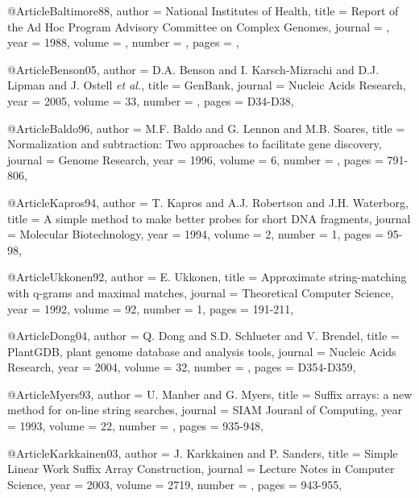 @Article{Baltimore88,
  author =      {{National Institutes of Health}},
  title =       {Report of the Ad Hoc Program Advisory Committee on Complex Genomes},
  journal =     {},
  year =        {1988},
  volume =      {},
  number =      {},
  pages =       {},
}


@Article{Benson05,
  author =       {D.A. Benson and I. Karsch-Mizrachi and D.J. Lipman and J. Ostell {\it et al.}},
  title =      {{GenBank}},
  journal =     {Nucleic Acids Research},
  year =        {2005},
  volume =      {33},
  number =      {},
  pages =       {D34-D38},
}

@Article{Baldo96,
  author =      {M.F. Baldo and G. Lennon and M.B. Soares},
  title =       {{Normalization and subtraction: Two approaches to facilitate gene discovery}},
  journal =     {Genome Research},
  year =        {1996},
  volume =      {6},
  number =      {},
  pages =       {791-806},
}

@Article{Kapros94,
  author =      {T. Kapros and A.J. Robertson and J.H. Waterborg},
  title =       {A simple method to make better probes for short {DNA} fragments},
  journal =     {Molecular Biotechnology},
  year =        {1994},
  volume =      {2},
  number =      {1},
  pages =       {95-98},
}




@Article{Ukkonen92,
  author =      {E. Ukkonen},
  title =       {Approximate string-matching with q-grams and maximal matches},
  journal =     {Theoretical Computer Science},
  year =        {1992},
  volume =      {92},
  number =      {1},
  pages =       {191-211},
}



@Article{Dong04,
  author =      {Q. Dong and S.D. Schlueter and V. Brendel},
  title =       {{PlantGDB, plant genome database and analysis tools}},
  journal =     {Nucleic Acids Research},
  year =        {2004},
  volume =      {32},
  number =      {},
  pages =       {D354-D359},
}




@Article{Myers93,
  author =      {U. Manber and G. Myers},
  title =       {Suffix arrays: a new method for on-line string searches},
  journal =     {SIAM Jouranl of Computing},
  year =        {1993},
  volume =      {22},
  number =      {},
  pages =       {935-948},
}

@Article{Karkkainen03,
  author =      {J. Karkkainen and P. Sanders},
  title =       {Simple Linear Work Suffix Array Construction},
  journal =     {Lecture Notes in Computer Science},
  year =        {2003},
  volume =      {2719},
  number =      {},
  pages =       {943-955},
}


